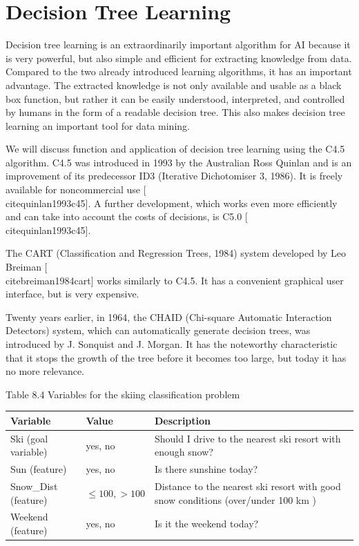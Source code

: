 \documentclass[10pt]{book}
\begin{document}
\section{Decision Tree Learning}
Decision tree learning is an extraordinarily important algorithm for AI because it is very powerful, but also simple and efficient for extracting knowledge from data. Compared to the two already introduced learning algorithms, it has an important advantage. The extracted knowledge is not only available and usable as a black box function, but rather it can be easily understood, interpreted, and controlled by humans in the form of a readable decision tree. This also makes decision tree learning an important tool for data mining.

We will discuss function and application of decision tree learning using the C4.5 algorithm. C4.5 was introduced in 1993 by the Australian Ross Quinlan and is an improvement of its predecessor ID3 (Iterative Dichotomiser 3, 1986). It is freely available for noncommercial use [\\cite{quinlan1993c45}]. A further development, which works even more efficiently and can take into account the costs of decisions, is C5.0 [\\cite{quinlan1993c45}].

The CART (Classification and Regression Trees, 1984) system developed by Leo Breiman [\\cite{breiman1984cart}] works similarly to C4.5. It has a convenient graphical user interface, but is very expensive.

Twenty years earlier, in 1964, the CHAID (Chi-square Automatic Interaction Detectors) system, which can automatically generate decision trees, was introduced by J. Sonquist and J. Morgan. It has the noteworthy characteristic that it stops the growth of the tree before it becomes too large, but today it has no more relevance.

Table 8.4 Variables for the skiing classification problem

\begin{center}
\begin{tabular}{|l|l|l|}
\hline
Variable & Value & Description \\
\hline
Ski (goal variable) & yes, no & Should I drive to the nearest ski resort with enough snow? \\
\hline
Sun (feature) & yes, no & Is there sunshine today? \\
\hline
Snow\_Dist (feature) & $\leq 100,>100$ & Distance to the nearest ski resort with good snow conditions (over/under 100 km ) \\
\hline
Weekend (feature) & yes, no & Is it the weekend today? \\
\hline
\end{tabular}
\end{center}
\end{document}
